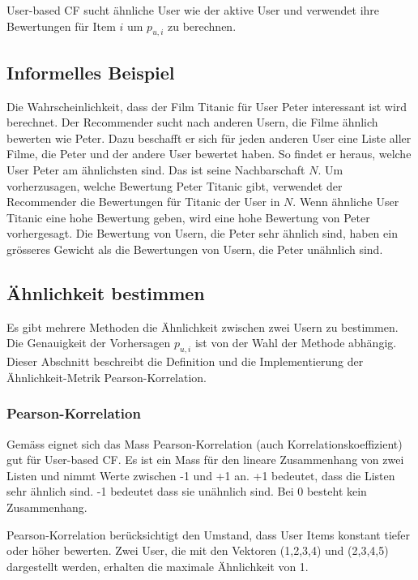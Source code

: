 \documentclass[a4paper, 12pt]{article}
\begin{document}
User-based CF sucht ähnliche User wie der aktive User und verwendet ihre Bewertungen für Item $i$ um $p_{u,i}$ zu berechnen.

\subsection{Informelles Beispiel}
\label{sec:example}

Die Wahrscheinlichkeit, dass der Film Titanic für User Peter interessant ist wird berechnet.
Der Recommender sucht nach anderen Usern, die Filme ähnlich bewerten wie Peter. Dazu beschafft er sich für jeden anderen User eine Liste aller Filme, die Peter und der andere User bewertet haben. So findet er heraus, welche User Peter am ähnlichsten sind. Das ist seine Nachbarschaft $N$. Um vorherzusagen, welche Bewertung Peter Titanic gibt, verwendet der Recommender die Bewertungen für Titanic der User in $N$. Wenn ähnliche User Titanic eine hohe Bewertung geben, wird eine hohe Bewertung von Peter vorhergesagt. Die Bewertung von Usern, die Peter sehr ähnlich sind, haben ein grösseres Gewicht als die Bewertungen von Usern, die Peter unähnlich sind.

\subsection{Ähnlichkeit bestimmen}
\label{sec:neigborhood}

Es gibt mehrere Methoden die Ähnlichkeit zwischen zwei Usern zu bestimmen.
Die Genauigkeit der Vorhersagen $p_{u,i}$ ist von der Wahl der Methode abhängig.
Dieser Abschnitt beschreibt die Definition und die Implementierung der Ähnlichkeit-Metrik Pearson-Korrelation.

\subsubsection{Pearson-Korrelation}
\label{sec:pearsoncorrelation}

Gemäss \cite{jannach11} eignet sich das Mass Pearson-Korrelation (auch Korrelationskoeffizient) gut für User-based CF. Es ist ein Mass für den lineare Zusammenhang von zwei Listen und nimmt Werte zwischen -1 und +1 an. +1 bedeutet, dass die Listen sehr ähnlich sind. -1 bedeutet dass sie unähnlich sind. Bei 0 besteht kein Zusammenhang.

Pearson-Korrelation berücksichtigt den Umstand, dass User Items konstant tiefer oder höher bewerten. Zwei User, die mit den Vektoren (1,2,3,4) und (2,3,4,5) dargestellt werden, erhalten die maximale Ähnlichkeit von 1.
\end{document}
